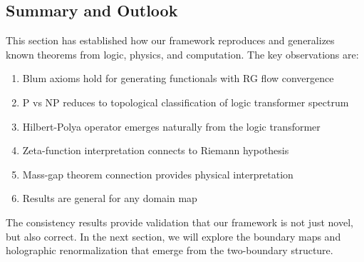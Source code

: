 \subsection{Summary and Outlook}

This section has established how our framework reproduces and generalizes known theorems from logic, physics, and computation. The key observations are:

\begin{enumerate}
\item Blum axioms hold for generating functionals with RG flow convergence
\item P vs NP reduces to topological classification of logic transformer spectrum
\item Hilbert-Polya operator emerges naturally from the logic transformer
\item Zeta-function interpretation connects to Riemann hypothesis
\item Mass-gap theorem connection provides physical interpretation
\item Results are general for any domain map
\end{enumerate}

The consistency results provide validation that our framework is not just novel, but also correct. In the next section, we will explore the boundary maps and holographic renormalization that emerge from the two-boundary structure.